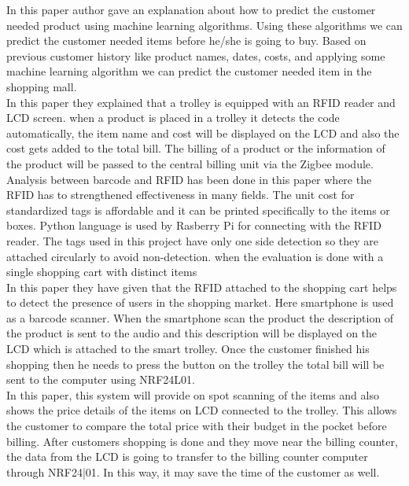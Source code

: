 \documentclass[conference]{IEEEtran}
\begin{document}
In this paper\cite{b4} author gave an explanation about how to predict the customer needed product using machine learning algorithms. Using these algorithms we can predict the customer needed items before he/she is going to buy. Based on previous customer history like product names, dates, costs, and applying some machine learning algorithm we can predict the customer needed item in the shopping mall.\\

In this paper\cite{b5} they explained that a trolley is equipped with an
RFID reader and LCD screen. when a product is placed in a trolley it detects
the code automatically, the item name and cost will be displayed on the LCD
and also the cost gets added to the total bill. The billing of a product or the
information of the product will be passed to the central billing unit via the
Zigbee module. Analysis between barcode and RFID has been done in this
paper where the RFID has to strengthened effectiveness in many fields. The
unit cost for standardized tags is affordable and it can be printed specifically to
the items or boxes. Python language is used by Rasberry Pi for connecting with
the RFID reader. The tags used in this project have only one side detection
so they are attached circularly to avoid non-detection. when the evaluation is
done with a single shopping cart with distinct items\\

In this paper\cite{b6} they have given that the RFID attached to the
shopping cart helps to detect the presence of users in the shopping market.
Here smartphone is used as a barcode scanner. When the smartphone scan the
product the description of the product is sent to the audio and this description
will be displayed on the LCD which is attached to the smart trolley. Once the
customer finished his shopping then he needs to press the button on the trolley
the total bill will be sent to the computer using NRF24L01.\\

In this paper\cite{b7}, this system will provide on spot scanning of the items and also shows the price details of the items on LCD connected to the trolley. This allows the customer to compare the total price with their 
budget in the pocket before billing. After customers shopping is done and they move near the billing counter, the data from the LCD is going to transfer to the billing counter computer through NRF24|01. In
this way, it may save the time of the customer as well.\\
\end{document}

